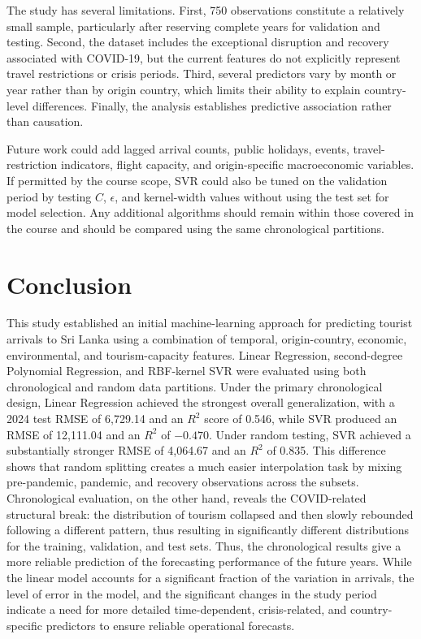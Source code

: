 \documentclass[conference,a4paper]{IEEEtran}
\begin{document}
The study has several limitations. First, 750 observations constitute a relatively small sample, particularly after reserving complete years for validation and testing. Second, the dataset includes the exceptional disruption and recovery associated with COVID-19, but the current features do not explicitly represent travel restrictions or crisis periods. Third, several predictors vary by month or year rather than by origin country, which limits their ability to explain country-level differences. Finally, the analysis establishes predictive association rather than causation.

Future work could add lagged arrival counts, public holidays, events, travel-restriction indicators, flight capacity, and origin-specific macroeconomic variables. If permitted by the course scope, SVR could also be tuned on the validation period by testing $C$, $\epsilon$, and kernel-width values without using the test set for model selection. Any additional algorithms should remain within those covered in the course and should be compared using the same chronological partitions.

\section{Conclusion}
This study established an initial machine-learning approach for predicting tourist arrivals to Sri Lanka using a combination of temporal, origin-country, economic, environmental, and tourism-capacity features. Linear Regression, second-degree Polynomial Regression, and RBF-kernel SVR were evaluated using both chronological and random data partitions. Under the primary chronological design, Linear Regression achieved the strongest overall generalization, with a 2024 test RMSE of 6,729.14 and an $R^2$ score of 0.546, while SVR produced an RMSE of 12,111.04 and an $R^2$ of $-0.470$. Under random testing, SVR achieved a substantially stronger RMSE of 4,064.67 and an $R^2$ of 0.835. This difference shows that random splitting creates a much easier interpolation task by mixing pre-pandemic, pandemic, and recovery observations across the subsets. Chronological evaluation, on the other hand, reveals the COVID-related structural break: the distribution of tourism collapsed and then slowly rebounded following a different pattern, thus resulting in significantly different distributions for the training, validation, and test sets. Thus, the chronological results give a more reliable prediction of the forecasting performance of the future years. While the linear model accounts for a significant fraction of the variation in arrivals, the level of error in the model, and the significant changes in the study period indicate a need for more detailed time-dependent, crisis-related, and country-specific predictors to ensure reliable operational forecasts.
\end{document}
